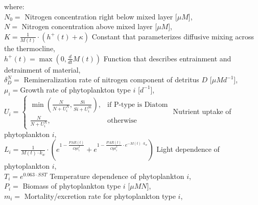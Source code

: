 \documentclass[11pt,letterpaper,english]{article}
\begin{document}
where:\\
\mbox{} \hspace{.5cm} $N_0=$ Nitrogen concentration right below mixed layer [$\mu M$],\\
\mbox{} \hspace{.5cm} $N=$ Nitrogen concentration above mixed layer [$\mu M$],\\
\mbox{} \hspace{.5cm} $K = \frac{1}{M(t)} \cdot \left(h^{+}(t) + \kappa\right)$ Constant that parameterizes diffusive mixing across the thermocline, \\
\mbox{} \hspace{.5cm} $h^{+}(t) = \max\left(0, \frac{d}{d t} M(t)\right)$ Function that describes entrainment and detrainment of material,\\
\mbox{} \hspace{.5cm} $\delta^N_D=$ Remineralization rate of nitrogen component of detritus $D$ [$\mu M d^{-1}$],\\
\mbox{} \hspace{.5cm} $\mu_i=$Growth rate of phytoplankton type $i$ [$d^{-1}$],\\


\mbox{} \hspace{.5cm} $U_i=\begin{cases}\min\left(\frac{N}{N + U^{N}_i}, \frac{Si}{Si + U^{Si}_i}\right),& \text{if P-type is Diatom}\\\frac{N}{N + U^{N}_i}, & \text{otherwise}\end{cases}$ Nutrient uptake of phytoplankton $i$,\\

\mbox{} \hspace{.5cm} $L_i=\frac{1}{M(t) \cdot k_{w}} \cdot \left(e^{1 - \frac{PAR(t)}{Opt^{I}_i}} + e^{1 - \frac{PAR(t)}{Opt^{I}_i} \cdot e^{- M(t) \cdot k_{w}}}\right)$ Light dependence of  phytoplankton $i$,\\
\mbox{} \hspace{.5cm} $T_i= e^{0.063 \cdot SST}$ Temperature dependence of phytoplankton $i$,\\

\mbox{} \hspace{.5cm} $P_i=$ Biomass of phytoplankton type $i$ [$\mu M N$],\\
\mbox{} \hspace{.5cm} $m_i=$ Mortality/excretion rate for phytoplankton type $i$,\\
\end{document}
